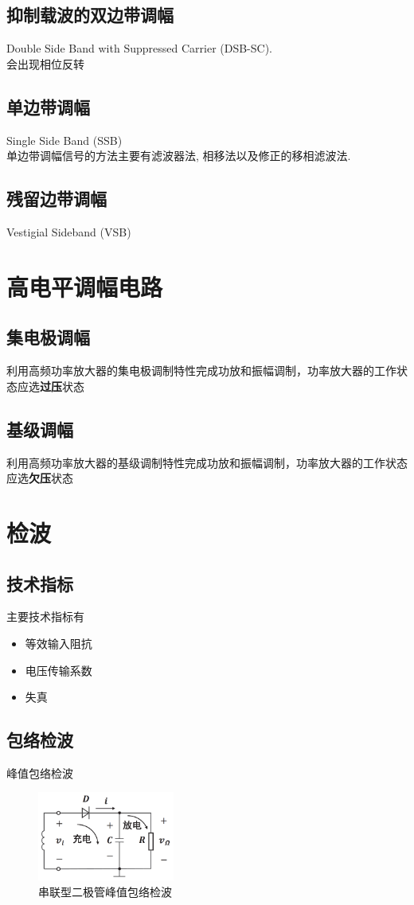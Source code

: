 \documentclass[a4paper]{report}
\begin{document}
\subsection{抑制载波的双边带调幅}
Double Side Band with Suppressed Carrier (DSB-SC). \\
会出现相位反转
\subsection{单边带调幅}
Single Side Band (SSB)\\
单边带调幅信号的方法主要有滤波器法, 相移法以及修正的移相滤波法. 
\subsection{残留边带调幅}
Vestigial Sideband (VSB)

\section{高电平调幅电路}
\subsection{集电极调幅}
利用高频功率放大器的集电极调制特性完成功放和振幅调制，功率放大器的工作状态应选\textbf{过压}状态
\subsection{基级调幅}
利用高频功率放大器的基级调制特性完成功放和振幅调制，功率放大器的工作状态应选\textbf{欠压}状态
\section{检波}
\subsection{技术指标}
主要技术指标有
\begin{itemize}
  \item 等效输入阻抗
  \item 电压传输系数
  \item 失真
\end{itemize}
\subsection{包络检波}
峰值包络检波
\begin{figure}[H]
\centering
\includegraphics[width=0.4\textwidth]{am_detector_1.png}
\caption{串联型二极管峰值包络检波}
\end{figure}
\end{document}
